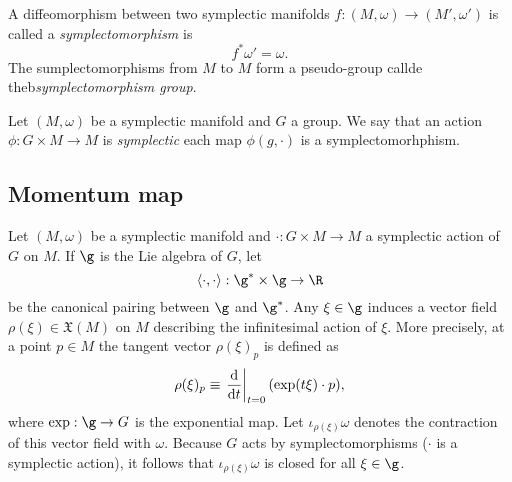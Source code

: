 \documentclass{worksheetclass}
\begin{document}
        \begin{defn}
            A diffeomorphism between two symplectic manifolds $f:(M,\omega)\to(M',\omega')$ is called a \emph{symplectomorphism} is
            \begin{equation*}
                f^*\omega' = \omega.
            \end{equation*}
            The sumplectomorphisms from $M$ to $M$ form a pseudo-group callde theb\emph{symplectomorphism group}.
        \end{defn}

        \begin{defn}
            Let $(M,\omega)$ be a symplectic manifold and $G$ a group. We say that an action $\phi:G\times M\to M$ is \emph{symplectic} each map $\phi(g,\cdot)$ is a symplectomorhphism.
        \end{defn}

    \subsection{Momentum map}\label{sec:momentummap}

        Let $(M,\omega)$ be a symplectic manifold and $\cdot:G\times M\to M$ a symplectic action of $G$ on $M$. If $\g$ is the Lie algebra of $G$, let
        \begin{equation}
            \langle\cdot,\cdot\rangle : \g^*\times\g\to\R
        \end{equation}
        be the canonical pairing between $\g$ and $\g^*$. Any $\xi\in\g$ induces a vector field $\rho(\xi)\in\mathfrak{X}(M)$ on $M$ describing the infinitesimal action of $\xi$. More precisely, at a point $p\in M$ the tangent vector $\rho(\xi)_p$ is defined as
        \begin{equation}
            \rho(\xi)_p\equiv\eval{\dv{}{t}}_{t=0}(\exp(t\xi)\cdot p),
        \end{equation}
        where $\exp:\g\to G$ is the exponential map. Let $\iota_{\rho(\xi)}\omega$ denotes the contraction of this vector field with $\omega$. Because $G$ acts by symplectomorphisms ($\cdot$ is a symplectic action), it follows that $\iota_{\rho(\xi)}\omega$ is closed for all $\xi\in\g$. 
        
\end{document}
